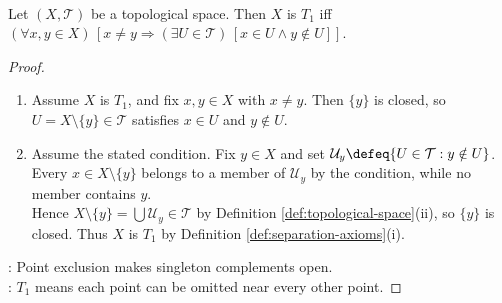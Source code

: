 \begin{proposition} \label{prop:t1-iff-singletons-closed} \\
Let $(X,\mathcal{T})$ be a topological space. Then $X$ is $T_1$ iff $(\forall x,y\in X)\,[x\neq y\Rightarrow(\exists U\in\mathcal{T})\,[x\in U\land y\notin U]]$.
\begin{proof}
\begin{enumerate}[label=\roman*.]
\setlength{\itemsep}{0pt}
\item[$(\Rightarrow)$] Assume $X$ is $T_1$, and fix $x,y\in X$ with $x\neq y$. Then $\{y\}$ is closed, so $U=X\setminus\{y\}\in\mathcal{T}$ satisfies $x\in U$ and $y\notin U$.
\item[$(\Leftarrow)$] Assume the stated condition. Fix $y\in X$ and set $\mathcal{U}_y\defeq\{U\in\mathcal{T}:y\notin U\}$.\\
Every $x\in X\setminus\{y\}$ belongs to a member of $\mathcal{U}_y$ by the condition, while no member contains $y$.\\
Hence $X\setminus\{y\}=\bigcup\mathcal{U}_y\in\mathcal{T}$ by Definition \ref{def:topological-space}(ii), so $\{y\}$ is closed. Thus $X$ is $T_1$ by Definition \ref{def:separation-axioms}(i).
\end{enumerate}
: Point exclusion makes singleton complements open.\\
: $T_1$ means each point can be omitted near every other point.
\end{proof}
\end{proposition}

